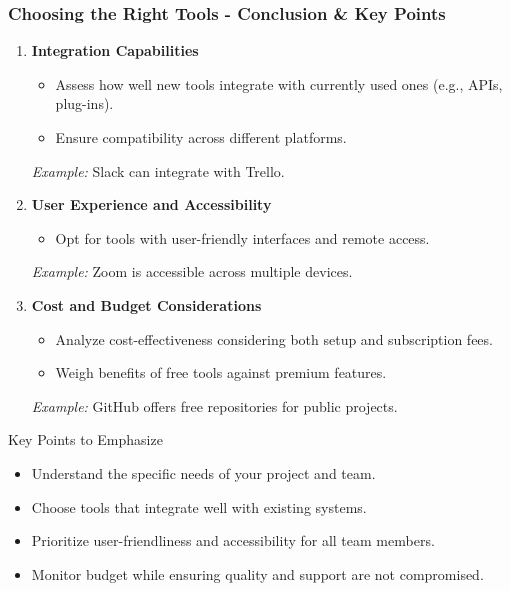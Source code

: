 \documentclass[aspectratio=169]{beamer}
\begin{document}
\begin{frame}[fragile]
    \frametitle{Choosing the Right Tools - Conclusion & Key Points}
    \begin{enumerate}
        \item \textbf{Integration Capabilities}
            \begin{itemize}
                \item Assess how well new tools integrate with currently used ones (e.g., APIs, plug-ins).
                \item Ensure compatibility across different platforms.
            \end{itemize}
            \textit{Example:} Slack can integrate with Trello.
        
        \item \textbf{User Experience and Accessibility}
            \begin{itemize}
                \item Opt for tools with user-friendly interfaces and remote access.
            \end{itemize}
            \textit{Example:} Zoom is accessible across multiple devices.
        
        \item \textbf{Cost and Budget Considerations}
            \begin{itemize}
                \item Analyze cost-effectiveness considering both setup and subscription fees.
                \item Weigh benefits of free tools against premium features.
            \end{itemize}
            \textit{Example:} GitHub offers free repositories for public projects.
    \end{enumerate}
    
    \begin{block}{Key Points to Emphasize}
        \begin{itemize}
            \item Understand the specific needs of your project and team.
            \item Choose tools that integrate well with existing systems.
            \item Prioritize user-friendliness and accessibility for all team members.
            \item Monitor budget while ensuring quality and support are not compromised.
        \end{itemize}
    \end{block}
\end{frame}
\end{document}
